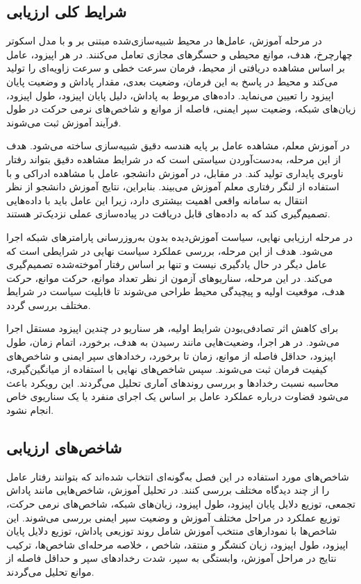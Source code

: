\subsection{شرایط کلی ارزیابی}
\label{subsec:evaluation_conditions}

در مرحله آموزش، عامل‌ها در محیط شبیه‌سازی‌شده مبتنی بر  و  با مدل اسکوتر چهارچرخ، هدف، موانع محیطی و حسگرهای مجازی تعامل می‌کنند. در هر اپیزود، عامل بر اساس مشاهده دریافتی از محیط، فرمان سرعت خطی و سرعت زاویه‌ای را تولید می‌کند و محیط در پاسخ به این فرمان، وضعیت بعدی، مقدار پاداش و وضعیت پایان اپیزود را تعیین می‌نماید. داده‌های مربوط به پاداش، دلیل پایان اپیزود، طول اپیزود، زیان‌های شبکه، وضعیت سپر ایمنی، فاصله از موانع و شاخص‌های نرمی حرکت در طول فرآیند آموزش ثبت می‌شوند.

در آموزش معلم، مشاهده عامل بر پایه هندسه دقیق شبیه‌سازی ساخته می‌شود. هدف از این مرحله، به‌دست‌آوردن سیاستی است که در شرایط مشاهده دقیق بتواند رفتار ناوبری پایداری تولید کند. در مقابل، در آموزش دانشجو، عامل با مشاهده ادراکی و با استفاده از لنگر رفتاری معلم آموزش می‌بیند. بنابراین، نتایج آموزش دانشجو از نظر انتقال به سامانه واقعی اهمیت بیشتری دارد، زیرا این عامل باید با داده‌هایی تصمیم‌گیری کند که به داده‌های قابل دریافت در پیاده‌سازی عملی نزدیک‌تر هستند.

در مرحله ارزیابی نهایی، سیاست آموزش‌دیده بدون به‌روزرسانی پارامترهای شبکه اجرا می‌شود. هدف از این مرحله، بررسی عملکرد سیاست نهایی در شرایطی است که عامل دیگر در حال یادگیری نیست و تنها بر اساس رفتار آموخته‌شده تصمیم‌گیری می‌کند. در این مرحله، سناریوهای آزمون از نظر تعداد موانع، حرکت موانع، حرکت هدف، موقعیت اولیه و پیچیدگی محیط طراحی می‌شوند تا قابلیت سیاست در شرایط مختلف بررسی گردد.

برای کاهش اثر تصادفی‌بودن شرایط اولیه، هر سناریو در چندین اپیزود مستقل اجرا می‌شود. در هر اجرا، وضعیت‌هایی مانند رسیدن به هدف، برخورد، اتمام زمان، طول اپیزود، حداقل فاصله از موانع، زمان تا برخورد، رخدادهای سپر ایمنی و شاخص‌های کیفیت فرمان ثبت می‌شوند. سپس شاخص‌های نهایی با استفاده از میانگین‌گیری، محاسبه نسبت رخدادها و بررسی روندهای آماری تحلیل می‌گردند. این رویکرد باعث می‌شود قضاوت درباره عملکرد عامل بر اساس یک اجرای منفرد یا یک سناریوی خاص انجام نشود.

\subsection{شاخص‌های ارزیابی}
\label{subsec:evaluation_metrics}

شاخص‌های مورد استفاده در این فصل به‌گونه‌ای انتخاب شده‌اند که بتوانند رفتار عامل را از چند دیدگاه مختلف بررسی کنند. در تحلیل آموزش، شاخص‌هایی مانند پاداش تجمعی، توزیع دلایل پایان اپیزود، طول اپیزود، زیان‌های شبکه، شاخص‌های نرمی حرکت، توزیع عملکرد در مراحل مختلف آموزش و وضعیت سپر ایمنی بررسی می‌شوند. این شاخص‌ها با نمودارهای منتخب آموزش شامل روند توزیعی پاداش، توزیع دلایل پایان اپیزود، طول اپیزود، زیان کنشگر و منتقد، شاخص ، خلاصه مرحله‌ای شاخص‌ها، ترکیب نتایج در مراحل آموزش، وابستگی به سپر، شدت رخدادهای سپر و حداقل فاصله از موانع تحلیل می‌گردند.

